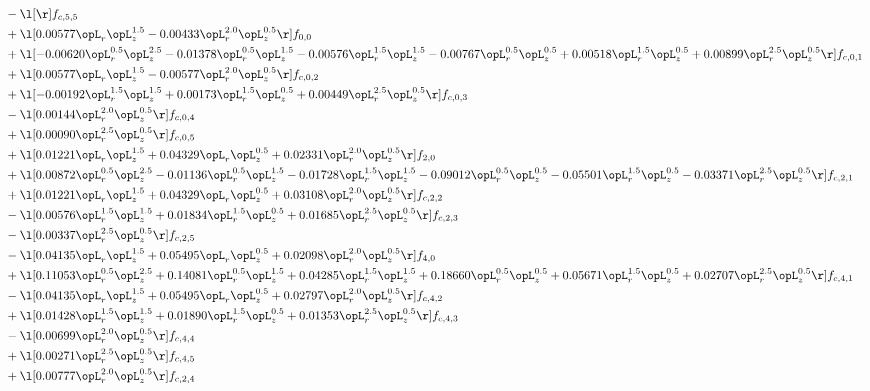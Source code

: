 \begin{alignat}{2}
& - \l[  \r] f_{c,5,5} \nonumber \\ 
& + \l[  0.00577 \opL_r \opL_z^{1.5}   -0.00433 \opL_r^{2.0} \opL_z^{0.5}  \r] f_{0,0} \nonumber \\ 
& + \l[  -0.00620 \opL_r^{0.5} \opL_z^{2.5}   -0.01378 \opL_r^{0.5} \opL_z^{1.5}   -0.00576 \opL_r^{1.5} \opL_z^{1.5}   -0.00767 \opL_r^{0.5} \opL_z^{0.5} +  0.00518 \opL_r^{1.5} \opL_z^{0.5} +  0.00899 \opL_r^{2.5} \opL_z^{0.5}  \r] f_{c,0,1} \nonumber \\ 
& + \l[  0.00577 \opL_r \opL_z^{1.5}   -0.00577 \opL_r^{2.0} \opL_z^{0.5}  \r] f_{c,0,2} \nonumber \\ 
& + \l[  -0.00192 \opL_r^{1.5} \opL_z^{1.5} +  0.00173 \opL_r^{1.5} \opL_z^{0.5} +  0.00449 \opL_r^{2.5} \opL_z^{0.5}  \r] f_{c,0,3} \nonumber \\ 
& - \l[  0.00144 \opL_r^{2.0} \opL_z^{0.5}  \r] f_{c,0,4} \nonumber \\ 
& + \l[  0.00090 \opL_r^{2.5} \opL_z^{0.5}  \r] f_{c,0,5} \nonumber \\ 
& + \l[  0.01221 \opL_r \opL_z^{1.5} +  0.04329 \opL_r \opL_z^{0.5} +  0.02331 \opL_r^{2.0} \opL_z^{0.5}  \r] f_{2,0} \nonumber \\ 
& + \l[  0.00872 \opL_r^{0.5} \opL_z^{2.5}   -0.01136 \opL_r^{0.5} \opL_z^{1.5}   -0.01728 \opL_r^{1.5} \opL_z^{1.5}   -0.09012 \opL_r^{0.5} \opL_z^{0.5}   -0.05501 \opL_r^{1.5} \opL_z^{0.5}   -0.03371 \opL_r^{2.5} \opL_z^{0.5}  \r] f_{c,2,1} \nonumber \\ 
& + \l[  0.01221 \opL_r \opL_z^{1.5} +  0.04329 \opL_r \opL_z^{0.5} +  0.03108 \opL_r^{2.0} \opL_z^{0.5}  \r] f_{c,2,2} \nonumber \\ 
& - \l[  0.00576 \opL_r^{1.5} \opL_z^{1.5} +  0.01834 \opL_r^{1.5} \opL_z^{0.5} +  0.01685 \opL_r^{2.5} \opL_z^{0.5}  \r] f_{c,2,3} \nonumber \\ 
& - \l[  0.00337 \opL_r^{2.5} \opL_z^{0.5}  \r] f_{c,2,5} \nonumber \\ 
& - \l[  0.04135 \opL_r \opL_z^{1.5} +  0.05495 \opL_r \opL_z^{0.5} +  0.02098 \opL_r^{2.0} \opL_z^{0.5}  \r] f_{4,0} \nonumber \\ 
& + \l[  0.11053 \opL_r^{0.5} \opL_z^{2.5} +  0.14081 \opL_r^{0.5} \opL_z^{1.5} +  0.04285 \opL_r^{1.5} \opL_z^{1.5} +  0.18660 \opL_r^{0.5} \opL_z^{0.5} +  0.05671 \opL_r^{1.5} \opL_z^{0.5} +  0.02707 \opL_r^{2.5} \opL_z^{0.5}  \r] f_{c,4,1} \nonumber \\ 
& - \l[  0.04135 \opL_r \opL_z^{1.5} +  0.05495 \opL_r \opL_z^{0.5} +  0.02797 \opL_r^{2.0} \opL_z^{0.5}  \r] f_{c,4,2} \nonumber \\ 
& + \l[  0.01428 \opL_r^{1.5} \opL_z^{1.5} +  0.01890 \opL_r^{1.5} \opL_z^{0.5} +  0.01353 \opL_r^{2.5} \opL_z^{0.5}  \r] f_{c,4,3} \nonumber \\ 
& - \l[  0.00699 \opL_r^{2.0} \opL_z^{0.5}  \r] f_{c,4,4} \nonumber \\ 
& + \l[  0.00271 \opL_r^{2.5} \opL_z^{0.5}  \r] f_{c,4,5} \nonumber \\ 
& + \l[  0.00777 \opL_r^{2.0} \opL_z^{0.5}  \r] f_{c,2,4} \nonumber \\ 
\end{alignat} 


